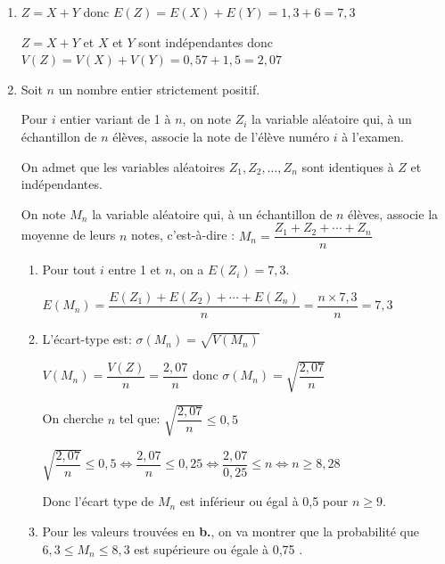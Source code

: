 \documentclass[10pt]{article}
\providecommand{\ds}{\displaystyle}
\begin{document}
\begin{enumerate}
\item 
$Z=X+Y$ donc $E(Z)=E(X)+E(Y)= 1,3+6=7,3$

$Z=X+Y$ et $X$ et $Y$ sont indépendantes donc $V(Z)=V(X)+V(Y)=0,57+1,5=2,07$

\item Soit $n$ un nombre entier strictement positif.

Pour $i$ entier variant de 1 à $n$, on note $Z_{i}$ la variable aléatoire qui, à un échantillon de $n$ élèves, associe la note de l'élève numéro $i$ à l'examen.

On admet que les variables aléatoires $Z_{1}, Z_{2}, \ldots, Z_{n}$ sont identiques à $Z$ et indépendantes.

On note $M_{n}$ la variable aléatoire qui, à un échantillon de $n$ élèves, associe la moyenne de leurs $n$ notes, c'est-à-dire :
$M_{n} = \dfrac{Z_{1} + Z_{2} + \cdots + Z_{n}}{n}$

	\begin{enumerate}
		\item 
Pour tout $i$ entre 1 et $n$, on a $E(Z_i)= 7,3$.

$E(M_n)=\dfrac{E(Z_{1}) + E(Z_{2}) + \cdots + E(Z_{n})}{n}
=\dfrac{n\times 7,3}{n} = 7,3$
		

		\item 
L'écart-type est: $\sigma(M_n) = \ds\sqrt{V(M_n)}$

$V(M_n)=\dfrac{V(Z)}{n}=\dfrac{2,07}{n}$ donc $\sigma(M_n) = \ds\sqrt{ \dfrac{2,07}{n}}$

On cherche $n$ tel que: $\ds\sqrt{ \dfrac{2,07}{n}}\leqslant 0,5$

$\ds\sqrt{ \dfrac{2,07}{n}}\leqslant 0,5
\iff \dfrac{2,07}{n} \leqslant 0,25
\iff \dfrac{2,07}{0,25}\leqslant n
\iff n\geqslant 8,28$

Donc l'écart type de $M_{n}$ est inférieur ou égal à 0,5 pour $n\geqslant 9$.

		\item Pour les valeurs trouvées en \textbf{b.}, on va montrer que la probabilité que\\
		 $6,3 \leqslant M_{n} \leqslant 8,3$ est supérieure ou égale à 0,75 .

\end{enumerate}
\end{enumerate}
\end{document}
